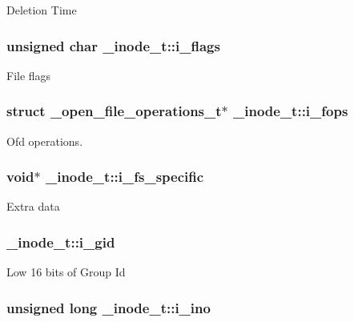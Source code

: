 \-Deletion \-Time \hypertarget{struct__inode__t_a36ff48a57a9e483d74682972d31ef46c}{
\subsubsection[{i\-\_\-flags}]{\setlength{\rightskip}{0pt plus 5cm}unsigned char {\bf \-\_\-inode\-\_\-t\-::i\-\_\-flags}}}\label{struct__inode__t_a36ff48a57a9e483d74682972d31ef46c}
\-File flags \hypertarget{struct__inode__t_acf149d7d1601f78142b1eec480badf7e}{
\subsubsection[{i\-\_\-fops}]{\setlength{\rightskip}{0pt plus 5cm}struct {\bf \-\_\-open\-\_\-file\-\_\-operations\-\_\-t}$\ast$ {\bf \-\_\-inode\-\_\-t\-::i\-\_\-fops}}}\label{struct__inode__t_acf149d7d1601f78142b1eec480badf7e}
\-Ofd operations. \hypertarget{struct__inode__t_a54e34439c448c46bae90fd040dadc5c0}{
\subsubsection[{i\-\_\-fs\-\_\-specific}]{\setlength{\rightskip}{0pt plus 5cm}void$\ast$ {\bf \-\_\-inode\-\_\-t\-::i\-\_\-fs\-\_\-specific}}}\label{struct__inode__t_a54e34439c448c46bae90fd040dadc5c0}
\-Extra data \hypertarget{struct__inode__t_a95d052a6e9b1b1e4f6837fa0f33b393e}{
\subsubsection[{i\-\_\-gid}]{ {\bf \-\_\-inode\-\_\-t\-::i\-\_\-gid}}}\label{struct__inode__t_a95d052a6e9b1b1e4f6837fa0f33b393e}
\-Low 16 bits of \-Group \-Id \hypertarget{struct__inode__t_aba602b843ba63a32ca3950dbaf7e959c}{
\subsubsection[{i\-\_\-ino}]{\setlength{\rightskip}{0pt plus 5cm}unsigned long {\bf \-\_\-inode\-\_\-t\-::i\-\_\-ino}}}\label{struct__inode__t_aba602b843ba63a32ca3950dbaf7e959c}
